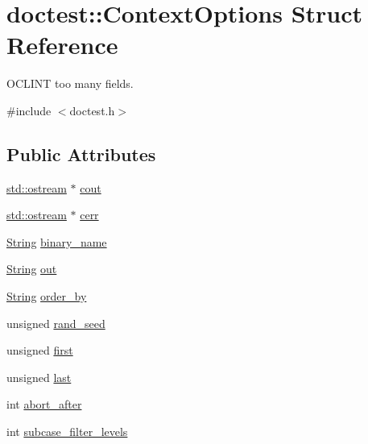 \hypertarget{structdoctest_1_1_context_options}{}\section{doctest\+:\+:Context\+Options Struct Reference}
\label{structdoctest_1_1_context_options}


O\+C\+L\+I\+NT too many fields.  




{\ttfamily \#include $<$doctest.\+h$>$}

\subsection*{Public Attributes}
\begin{DoxyCompactItemize}
\item 
\mbox{\hyperlink{doctest_8h_a116af65cb5e924b33ad9d9ecd7a783f3}{std\+::ostream}} $\ast$ \mbox{\hyperlink{structdoctest_1_1_context_options_a1ee59adf440880ebd7b31516471ddcab}{cout}}
\item 
\mbox{\hyperlink{doctest_8h_a116af65cb5e924b33ad9d9ecd7a783f3}{std\+::ostream}} $\ast$ \mbox{\hyperlink{structdoctest_1_1_context_options_af4424b66280bdf050e0cc0dbf8975487}{cerr}}
\item 
\mbox{\hyperlink{classdoctest_1_1_string}{String}} \mbox{\hyperlink{structdoctest_1_1_context_options_a0590006b4d10296c9a697e32ff886f74}{binary\+\_\+name}}
\item 
\mbox{\hyperlink{classdoctest_1_1_string}{String}} \mbox{\hyperlink{structdoctest_1_1_context_options_a51b278efd4662f92bb3f7eb6a57974ba}{out}}
\item 
\mbox{\hyperlink{classdoctest_1_1_string}{String}} \mbox{\hyperlink{structdoctest_1_1_context_options_a397c99d733e24fc87f8da6f6eda855da}{order\+\_\+by}}
\item 
unsigned \mbox{\hyperlink{structdoctest_1_1_context_options_ab312bdc6f3c16646f04f75742f87ce0a}{rand\+\_\+seed}}
\item 
unsigned \mbox{\hyperlink{structdoctest_1_1_context_options_a9f26ee60a5259e73f9f25ce3f4883a97}{first}}
\item 
unsigned \mbox{\hyperlink{structdoctest_1_1_context_options_a5aaf1b28f6a46d8acb40898a502b6bef}{last}}
\item 
int \mbox{\hyperlink{structdoctest_1_1_context_options_a8ba5bfec2229bc2da9ab917f4bdee5e7}{abort\+\_\+after}}
\item 
int \mbox{\hyperlink{structdoctest_1_1_context_options_a93281aa958eed5c2a1533d404b1ebeff}{subcase\+\_\+filter\+\_\+levels}}

\end{DoxyCompactItemize}
